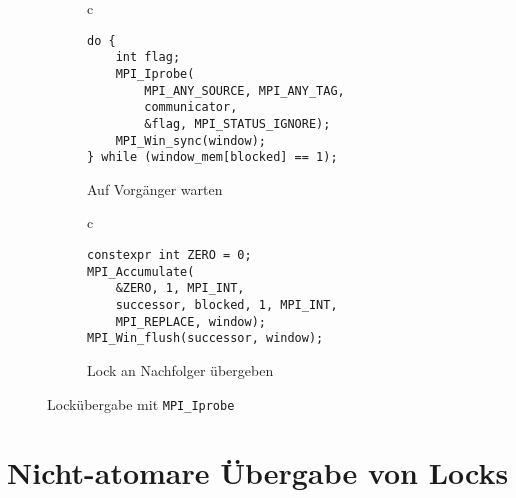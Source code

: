 \clearpage

\begin{figure}[h]
    \begin{subfigure}[b]{.5\textwidth}
        \centering
        \begin{tabular}{c}\begin{lstlisting}
do {
    int flag;
    MPI_Iprobe(
        MPI_ANY_SOURCE, MPI_ANY_TAG,
        communicator,
        &flag, MPI_STATUS_IGNORE);
    MPI_Win_sync(window);
} while (window_mem[blocked] == 1);
        \end{lstlisting}\end{tabular}
        \caption{Auf Vorgänger warten}
        \label{fig:wait_iprobe}
    \end{subfigure}
    \begin{subfigure}[b]{.5\textwidth}
        \centering
        \begin{tabular}{c}\begin{lstlisting}
constexpr int ZERO = 0;
MPI_Accumulate(
    &ZERO, 1, MPI_INT,
    successor, blocked, 1, MPI_INT,
    MPI_REPLACE, window);
MPI_Win_flush(successor, window);
        \end{lstlisting}\end{tabular}
        \caption{Lock an Nachfolger übergeben}
        \label{fig:release_iprobe}
    \end{subfigure}
    \caption{Lockübergabe mit \texttt{MPI\_Iprobe}}
    \label{fig:iprobe_lock_passing}
\end{figure}

\section{Nicht-atomare Übergabe von Locks}
\label{sec:non_atomic_lock_passing}

